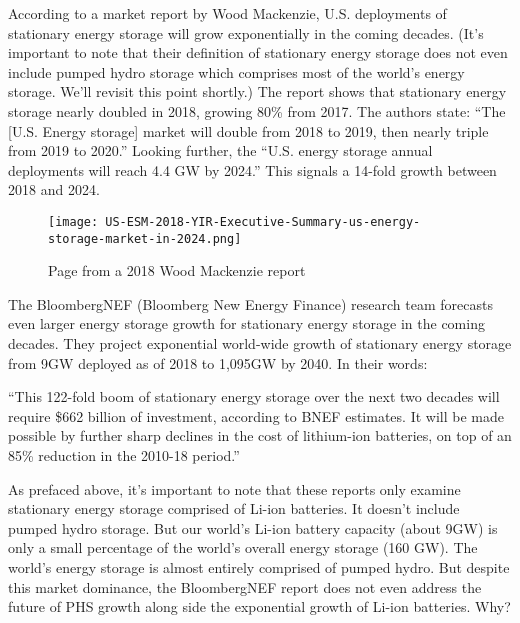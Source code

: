 \documentclass[hidelinks,12pt,a4paper]{article}
\begin{document}
According to a market report by Wood Mackenzie, U.S. deployments of stationary energy storage will grow exponentially in the coming decades. (It's important to note that their definition of stationary energy storage does not even include pumped hydro storage which comprises most of the world's energy storage. We'll revisit this point shortly.) The report shows that stationary energy storage nearly doubled in 2018, growing 80\% from 2017. \cite{USEnergyStorageMonitor2018YIRAndQ12019} The authors state: “The [U.S. Energy storage] market will double from 2018 to 2019, then nearly triple from 2019 to 2020.” Looking further, the “U.S. energy storage annual deployments will reach 4.4 GW by 2024.” This signals a 14-fold growth between 2018 and 2024.

\begin{figure}[ht!]
    \centering
    \texttt{[image: US-ESM-2018-YIR-Executive-Summary-us-energy-storage-market-in-2024.png]}
    \caption{Page from a 2018 Wood Mackenzie report \cite{USEnergyStorageMonitor2018YIRAndQ12019}}
\end{figure}
\FloatBarrier

The BloombergNEF (Bloomberg New Energy Finance) research team forecasts even larger energy storage growth for stationary energy storage in the coming decades. They project exponential world-wide growth of stationary energy storage from 9GW deployed as of 2018 to 1,095GW by 2040. In their words:

\begin{displayquote}
“This 122-fold boom of stationary energy storage over the next two decades will require \$662 billion of investment, according to BNEF estimates. It will be made possible by further sharp declines in the cost of lithium-ion batteries, on top of an 85\% reduction in the 2010-18 period.” \cite{EnergyStorageInvestmentsBoom}
\end{displayquote}

As prefaced above, it's important to note that these reports only examine stationary energy storage comprised of Li-ion batteries. It doesn't include pumped hydro storage. But our world's Li-ion battery capacity (about 9GW) is only a small percentage of the world's overall energy storage (160 GW). \cite{ElectricityAndEnergyStorageWorldNuclearAssociation} The world's energy storage is almost entirely comprised of pumped hydro. But despite this market dominance, the BloombergNEF report does not even address the future of PHS growth along side the exponential growth of Li-ion batteries. Why?
\end{document}
